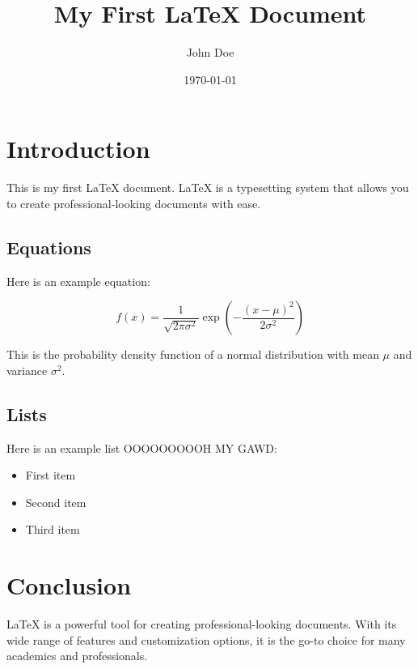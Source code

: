 \documentclass{article} %
\title{My First LaTeX Document} %
\author{John Doe} %
\date{\today} %
\begin{document}

\maketitle %

\section{Introduction} %
This is my first LaTeX document. LaTeX is a typesetting system that allows you to create professional-looking documents with ease.

\subsection{Equations} %
Here is an example equation:

\begin{equation} %
    f(x) = \frac{1}{\sqrt{2\pi\sigma^2}}\exp\left(-\frac{(x-\mu)^2}{2\sigma^2}\right)
\end{equation} %

This is the probability density function of a normal distribution with mean $\mu$ and variance $\sigma^2$.

\subsection{Lists} %
Here is an example list OOOOOOOOOH MY GAWD:

\begin{itemize} %
    \item First item
    \item Second item
    \item Third item
\end{itemize} %

\section{Conclusion} %
LaTeX is a powerful tool for creating professional-looking documents. With its wide range of features and customization options, it is the go-to choice for many academics and professionals. 
\end{document}
